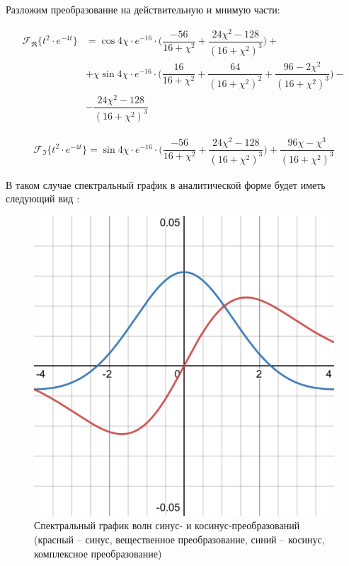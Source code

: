 \documentclass[a4paper, 14pt]{extarticle}
\begin{document}
		Разложим преобразование на действительную и мнимую части:
		
		\begin{align*}
			\mathscr{F_{\Re}}\big\{t^2\cdot e^{-4t}\big\} &= \cos{4\chi}\cdot e^{-16}\cdot\Bigg(\dfrac{-56}{16+\chi^2} + \dfrac{24\chi^2-128}{(16 + \chi^2)^3}\Bigg) + \\ &+ \chi\sin{4\chi}\cdot e^{-16}\cdot\Bigg(\dfrac{16}{16+\chi^2} + \dfrac{64}{(16+\chi^2)^2} + \dfrac{96 - 2\chi^2}{(16+\chi^2)^3}\Bigg) -\\&- \dfrac{24\chi^2-128}{(16+\chi^2)^3}
		\end{align*}
	
		\begin{align*}
			\mathscr{F_{\Im}}\big\{t^2\cdot e^{-4t}\big\} = \sin{4\chi}\cdot e^{-16}\cdot\Bigg(\dfrac{-56}{16+\chi^2} + \dfrac{24\chi^2-128}{(16 + \chi^2)^3} \Bigg) + \dfrac{96\chi - \chi^3}{(16+\chi^2)^3}
		\end{align*}
		
		В таком случае спектральный график в аналитической форме будет иметь следующий вид :
		\begin{figure}[H]
			\centering
			\includegraphics[width = .6\linewidth]{plot1.pdf}
			\caption[.] {Спектральный график волн синус- и косинус-преобразований (красный -- синус, вещественное преобразование, синий -- косинус, комплексное преобразование)}
		\end{figure}
	
\end{document}
